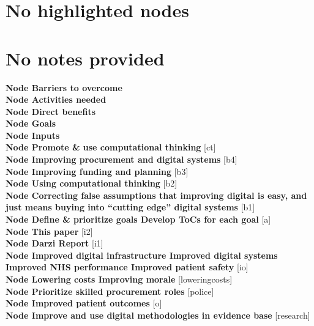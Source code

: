 \title{}\author{}
\date{}
 \maketitle
\def\colorflag#1{\fboxrule=0.3pt
\fboxsep=0pt
\hbox{\vrule height 2.2ex width 1pt
\raise 1ex\hbox{\fbox{\color{#1}\hbox{\vrule width .5ex height 1ex depth 0ex}}}%
\hskip -.6pt\raise .9ex\hbox{\fbox{\color{#1}\hbox{\vrule width .5ex height 1ex depth 0ex}}}%
\hskip -.6pt\raise 1ex\hbox{\fbox{\color{#1}\hbox{\vrule width .7ex height 1ex depth 0ex}}}}%
}
\section*{No highlighted nodes}
\section*{No notes provided}
\textbf{Node  Barriers to overcome }\\\textbf{Node  Activities needed    }\\\textbf{Node  Direct benefits      }\\\textbf{Node  Goals                }\\\textbf{Node  Inputs               }\\\textbf{Node  Promote & use computational thinking} [ct]\\\textbf{Node  Improving procurement and digital systems} [b4]\\\textbf{Node  Improving funding and planning} [b3]\\\textbf{Node  Using computational thinking} [b2]\\\textbf{Node  Correcting false assumptions that improving digital is easy, and just means buying into “cutting edge” digital systems} [b1]\\\textbf{Node  Define & prioritize goals Develop ToCs for each goal} [a]\\\textbf{Node  This paper} [i2]\\\textbf{Node  Darzi Report} [i1]\\\textbf{Node  Improved digital infrastructure Improved digital systems Improved NHS performance Improved patient safety} [io]\\\textbf{Node  Lowering costs Improving morale} [loweringcosts]\\\textbf{Node  Prioritize skilled procurement roles} [police]\\\textbf{Node  Improved patient outcomes} [o]\\\textbf{Node  Improve and use digital methodologies in evidence base} [research]\\
